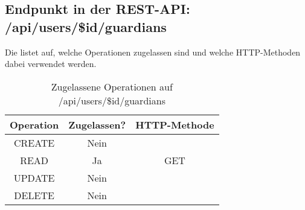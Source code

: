 \subsection{Endpunkt in der REST-API: /api/users/\$id/guardians}
Die  listet auf, welche Operationen zugelassen sind und welche HTTP-Methoden dabei verwendet werden. 

\begin{table}[!htbp]
	\begin{tabular}{|c|c|c|}
		\hline
			\textbf{Operation} & \textbf{Zugelassen?} & \textbf{HTTP-Methode} \\ \hline
			CREATE & Nein &  \\ \hline 
			READ & Ja & GET \\ \hline
			UPDATE & Nein & \\ \hline 
			DELETE & Nein & \\ \hline
	\end{tabular}

		\caption{Zugelassene Operationen auf /api/users/\$id/guardians}
		\label{tab:rest:api:users:id:guardians:meth}
\end{table}

